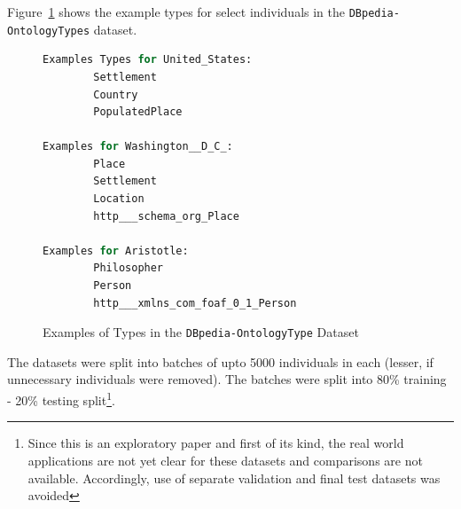 \documentclass[runningheads,a4paper]{IEEEtran}
\begin{document}
Figure~\ref{typeExamples} shows the example types for select individuals in the \texttt{DBpedia-OntologyTypes} dataset.
\begin{figure}[t]
\begin{lstlisting}[language=Python,basicstyle=\tiny, frame=single]
Examples Types for United_States: 
		Settlement
		Country
		PopulatedPlace

Examples for Washington__D_C_: 
		Place
		Settlement
		Location
		http___schema_org_Place

Examples for Aristotle: 
		Philosopher
		Person
		http___xmlns_com_foaf_0_1_Person
\end{lstlisting}
\caption{Examples of Types in the \texttt{DBpedia-OntologyType} Dataset}
\label{typeExamples}
\end{figure}

%
The datasets were split into batches of upto 5000 individuals in each (lesser, if unnecessary individuals were removed). The batches were split into 80\% training - 20\% testing split\footnote{Since this is an exploratory paper and first of its kind, the real world applications are not yet clear for these datasets and comparisons are not available. Accordingly, use of separate validation and final test datasets was avoided}.  
\end{document}
